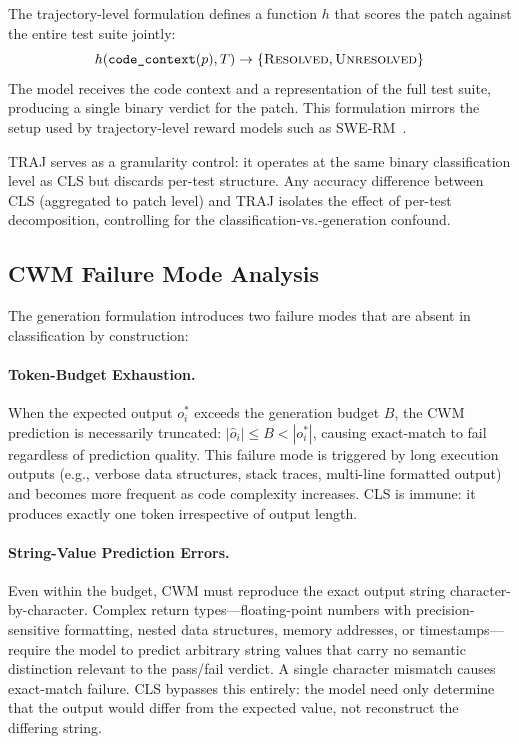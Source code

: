 The trajectory-level formulation defines a function $h$ that scores the patch against the entire test suite jointly:
\begin{equation}
    h(\texttt{code\_context}(p), T) \rightarrow \{\textsc{Resolved}, \textsc{Unresolved}\}
    \label{eq:traj}
\end{equation}
The model receives the code context and a representation of the full test suite, producing a single binary verdict for the patch. This formulation mirrors the setup used by trajectory-level reward models such as SWE-RM~\cite{zhang2025swerm}.

TRAJ serves as a granularity control: it operates at the same binary classification level as CLS but discards per-test structure. Any accuracy difference between CLS (aggregated to patch level) and TRAJ isolates the effect of per-test decomposition, controlling for the classification-vs.-generation confound.

\subsection{CWM Failure Mode Analysis}
\label{ssec:failure_modes}

The generation formulation introduces two failure modes that are absent in classification by construction:

\paragraph{Token-Budget Exhaustion.}
When the expected output $o_i^*$ exceeds the generation budget $B$, the CWM prediction is necessarily truncated: $|\hat{o}_i| \leq B < |o_i^*|$, causing exact-match to fail regardless of prediction quality. This failure mode is triggered by long execution outputs (e.g., verbose data structures, stack traces, multi-line formatted output) and becomes more frequent as code complexity increases. CLS is immune: it produces exactly one token irrespective of output length.

\paragraph{String-Value Prediction Errors.}
Even within the budget, CWM must reproduce the exact output string character-by-character. Complex return types---floating-point numbers with precision-sensitive formatting, nested data structures, memory addresses, or timestamps---require the model to predict arbitrary string values that carry no semantic distinction relevant to the pass/fail verdict. A single character mismatch causes exact-match failure. CLS bypasses this entirely: the model need only determine that the output would differ from the expected value, not reconstruct the differing string.

